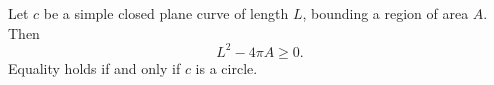 Let $c$ be a simple closed plane curve of length $L$, bounding a region of area $A$. Then
$$L^2 - 4\pi A \geq 0.$$
Equality holds if and only if $c$ is a circle.